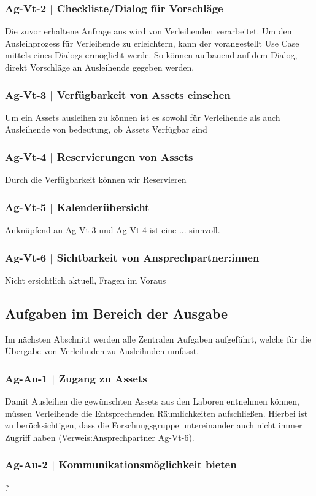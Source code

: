 \subsubsection{Ag-Vt-2 | Checkliste/Dialog für Vorschläge}
Die zuvor erhaltene Anfrage aus  wird von Verleihenden verarbeitet.
Um den Ausleihprozess für Verleihende zu erleichtern, kann der vorangestellt Use Case mittels eines
Dialogs ermöglicht werde. So können aufbauend auf dem Dialog, direkt Vorschläge an Ausleihende gegeben
werden.
\subsubsection{Ag-Vt-3 | Verfügbarkeit von Assets einsehen}
Um ein Assets ausleihen zu können ist es sowohl für Verleihende als auch Ausleihende von bedeutung,
ob Assets Verfügbar sind
\subsubsection{Ag-Vt-4 | Reservierungen von Assets}
Durch die Verfügbarkeit können wir Reservieren
\subsubsection{Ag-Vt-5 | Kalenderübersicht}
Anknüpfend an Ag-Vt-3 und Ag-Vt-4 ist eine ... sinnvoll.
\subsubsection{Ag-Vt-6 | Sichtbarkeit von Ansprechpartner:innen}
Nicht ersichtlich aktuell, Fragen im Voraus 

\subsection{Aufgaben im Bereich der Ausgabe}
Im nächsten Abschnitt werden alle Zentralen Aufgaben aufgeführt, welche für die Übergabe von
Verleihnden zu Ausleihnden umfasst.
\subsubsection{Ag-Au-1 | Zugang zu Assets}
Damit Ausleihen die gewünschten Assets aus den Laboren entnehmen können, müssen Verleihende die
Entsprechenden Räumlichkeiten aufschließen. Hierbei ist zu berücksichtigen, dass die
Forschungsgruppe untereinander auch nicht immer Zugriff haben (Verweis:Ansprechpartner Ag-Vt-6).
\subsubsection{Ag-Au-2 | Kommunikationsmöglichkeit bieten}
?
